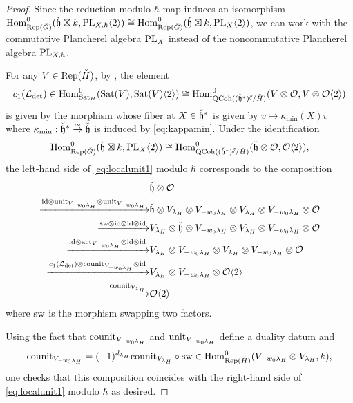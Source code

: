 \documentclass[reqno]{amsart}
\numberwithin{equation}{section}
\numberwithin{equation}{section}
\begin{document}
\begin{proof}
    Since the reduction modulo $\hbar$ map induces an isomorphism $\operatorname{Hom}^0_{\operatorname{Rep}(\check{G})}(\check{\mathfrak{h}}\boxtimes k, \mathrm{PL}_{X,\hbar}\langle 2\rangle)\cong \operatorname{Hom}^0_{\operatorname{Rep}(\check{G})}(\check{\mathfrak{h}}\boxtimes k, \mathrm{PL}_{X}\langle 2\rangle)$, we can work with the commutative Plancherel algebra $\mathrm{PL}_X$ instead of the noncommutative Plancherel algebra $\mathrm{PL}_{X,\hbar}$. 

    For any $V\in \operatorname{Rep}(\check{H})$, by \cite[Proposition\,5.7]{yun2011integral}, the element \[c_1(\mathcal{L}_{\det})\in \operatorname{Hom}^0_{\operatorname{Sat}_H}(\operatorname{Sat}(V),\operatorname{Sat}(V)\langle 2\rangle)\cong \operatorname{Hom}^0_{\mathrm{QCoh}((\check{\mathfrak{h}}^*)^{{\mathbin{\mkern-6mu\fatslash}}}/\check{H})}(V \otimes\mathcal{O},V\otimes \mathcal{O}\langle 2\rangle)\] is given by the morphism whose fiber at $X\in \check{\mathfrak{h}}^*$ is given by $v\mapsto \kappa_{\min}(X)v$ where $\kappa_{\min}:\check{\mathfrak{h}}^*\stackrel{\sim}{\to} \check{\mathfrak{h}}$ is induced by \eqref{eq:kappamin}. Under the identification \[\operatorname{Hom}^0_{\operatorname{Rep}(\check{G})}(\check{\mathfrak{h}}\boxtimes k,\mathrm{PL}_{X}\langle 2\rangle)\cong \operatorname{Hom}^0_{\mathrm{QCoh}((\check{\mathfrak{h}}^*)^{{\mathbin{\mkern-6mu\fatslash}}}/\check{H})}(\check{\mathfrak{h}}\otimes\mathcal{O},\mathcal{O}\langle 2\rangle),\] the left-hand side of \eqref{eq:localunit1} modulo $\hbar$ corresponds to the composition \begin{equation}\begin{split}
         & \check{\mathfrak{h}}\otimes\mathcal{O} \\ 
         \xrightarrow{\mathrm{id}  \otimes \mathrm{unit}_{V_{-w_0\lambda_H}} \otimes  \mathrm{unit}_{V_{-w_0\lambda_H}}  } & \check{\mathfrak{h}}\otimes V_{\lambda_H}\otimes V_{-w_0\lambda_H}\otimes  V_{\lambda_H}\otimes V_{-w_0\lambda_H} \otimes  \mathcal{O} \\ 
         \xrightarrow{\mathrm{sw}\otimes\mathrm{id}\otimes\mathrm{id}\otimes\mathrm{id}  } & V_{\lambda_H} \otimes \check{\mathfrak{h}}\otimes V_{-w_0\lambda_H}\otimes  V_{\lambda_H}\otimes V_{-w_0\lambda_H} \otimes  \mathcal{O} \\ 
         \xrightarrow{\mathrm{id}\otimes \mathrm{act}_{V_{-w_0\lambda_H}} \otimes \mathrm{id} \otimes  \mathrm{id} } & V_{\lambda_H}\otimes V_{-w_0\lambda_H}\otimes  V_{\lambda_H}\otimes V_{-w_0\lambda_H} \otimes  \mathcal{O} \\ 
        \xrightarrow{c_1(\mathcal{L}_{\det})\otimes\mathrm{counit}_{V_{-w_0\lambda_H}}\otimes \mathrm{id}} & V_{\lambda_H}\otimes V_{-w_0\lambda_H}\otimes\mathcal{O} \langle 2\rangle \\
         \xrightarrow{\mathrm{counit}_{V_{\lambda_H}} } & \mathcal{O}\langle 2\rangle
    \end{split}\end{equation} where $\mathrm{sw}$ is the morphism swapping two factors.

    Using the fact that $\mathrm{counit}_{V_{-w_0\lambda_H}}$ and $\mathrm{unit}_{V_{-w_0\lambda_H}}$ define a duality datum and \[\mathrm{counit}_{V_{-w_0\lambda_H}}=(-1)^{d_{\lambda_H} }\mathrm{counit}_{V_{\lambda_H}}\circ \mathrm{sw}\in \operatorname{Hom}^0_{\operatorname{Rep}(\check{H})}(V_{-w_0\lambda_H}\otimes V_{\lambda_H},k),\] one checks that this composition coincides with the right-hand side of \eqref{eq:localunit1} modulo $\hbar$ as desired.
\end{proof}
\end{document}
